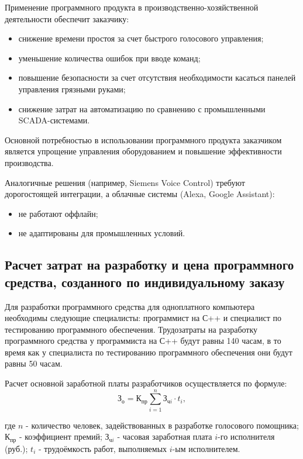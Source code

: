 Применение программного продукта в производственно-хозяйственной деятельности обеспечит заказчику:
\begin{itemize}
	\item снижение времени простоя за счет быстрого голосового управления;
	\item уменьшение количества ошибок при вводе команд;
	\item повышение безопасности за счет отсутствия необходимости касаться панелей управления грязными руками;
	\item снижение затрат на автоматизацию по сравнению с промышленными SCADA-системами.
\end{itemize}


Основной потребностью в использовании программного продукта заказчиком является упрощение управления оборудованием и повышение эффективности производства. 

Аналогичные решения (например, Siemens Voice Control) требуют дорогостоящей интеграции, а облачные системы (Alexa, Google Assistant):
\begin{itemize}
	\item не работают оффлайн;
	\item не адаптированы для промышленных условий.
\end{itemize}




\subsection{Расчет затрат на разработку и цена программного средства, созданного по индивидуальному заказу} 


Для разработки программного средства для одноплатного компьютера необходимы следующие специалисты: программист на С++ и специалист по тестированию программного обеспечения. Трудозатраты на разработку программного средства у программиста на С++ будут равны 140 часам, в то время как у специалиста по тестированию программного обеспечения они будут равны 50 часам.

Расчет основной заработной платы разработчиков осуществляется по формуле:
\begin{equation}
	 \mathrm{З_{о}} =  \mathrm{К_{пр}} \sum_{i=1}^n \text{З}_{\text{ч}i} \cdot t_i,
	\label{eq:formula}
\end{equation}

где $n$ - количество человек, задействованных в разработке голосового помощника; 
$\text{К}_{\text{пр}}$ - коэффициент премий; 
$\text{З}_{\text{ч}i}$ - часовая заработная плата $i$-го исполнителя (руб.); 
$t_i$ - трудоёмкость работ, выполняемых $i$-ым исполнителем.

